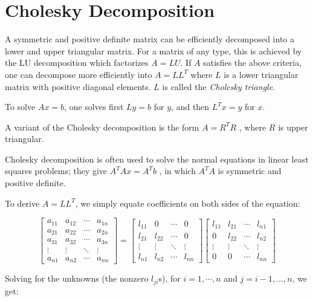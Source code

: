 \documentclass[12pt]{article}
\begin{document}
\section{Cholesky Decomposition}

A symmetric and positive definite matrix can be efficiently decomposed into a lower and upper triangular matrix. For a matrix of any type, this is achieved by the LU decomposition which factorizes $A = LU$. If $A$ satisfies the above criteria, one can decompose more efficiently into $A=LL^T$ where $L$ is a lower triangular matrix with positive diagonal elements. $L$ is called the \emph{Cholesky triangle}.

To solve $Ax = b$, one solves first $Ly = b$ for $y$, and then $L^Tx=y$ for $x$.

A variant of the Cholesky decomposition is the form $A=R^TR$ , where $R$ is upper triangular.

Cholesky decomposition is often used to solve the normal equations in linear least squares problems; they give $A^TAx=A^Tb$ , in which $A^TA$ is symmetric and positive definite.

To derive $A=LL^T$, we simply equate coefficients on both sides of the equation:

$$ 
\begin{bmatrix}
 a_{11} & a_{12} & \cdots & a_{1n} \\
 a_{21} & a_{22} & \cdots & a_{2n} \\
 a_{31} & a_{32} & \cdots & a_{3n} \\
 \vdots & \vdots & \ddots & \vdots \\
 a_{n1} & a_{n2} & \cdots & a_{nn} 
\end{bmatrix}
=
\begin{bmatrix}
 l_{11} & 0      & \cdots & 0 \\
 l_{21} & l_{22} & \cdots & 0 \\
 \vdots & \vdots & \ddots & \vdots \\
 l_{n1} & l_{n2} & \cdots & l_{nn}
\end{bmatrix}
\begin{bmatrix}
 l_{11} & l_{21} & \cdots & l_{n1} \\
 0      & l_{22} & \cdots & l_{n2} \\
 \vdots & \vdots & \ddots & \vdots \\
 0      & 0      & \cdots & l_{nn}
\end{bmatrix}
$$ 

Solving for the unknowns (the nonzero $l_{ji}$s), for $i=1,\cdots ,n$ and $j=i-1,\ldots ,n$, we get:
\end{document}
